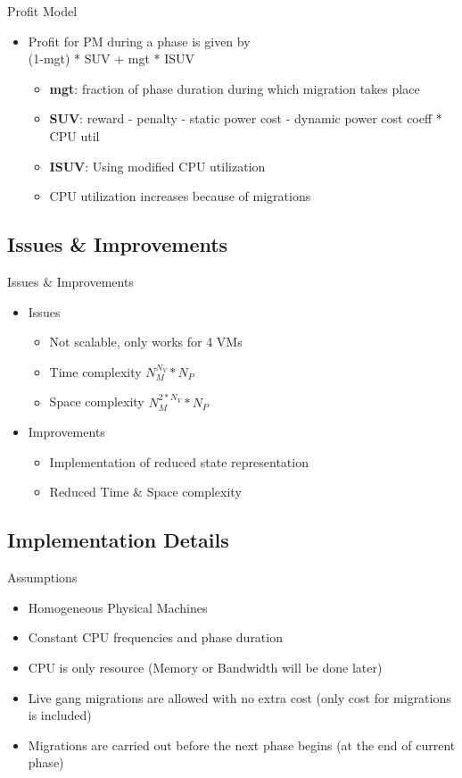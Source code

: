 \documentclass{beamer}
\begin{document}
\begin{frame}{Profit Model}
\begin{itemize}
\item Profit for PM during a phase is given by \\
(1-mgt) * SUV + mgt * ISUV
\begin{itemize}
\item \textbf{mgt}: fraction of phase duration during which migration takes place
\item \textbf{SUV}: reward - penalty - static power cost - dynamic power cost coeff * CPU util
\item \textbf{ISUV}: Using modified CPU utilization
\item CPU utilization increases because of migrations
\end{itemize}
\end{itemize}
\end{frame}

\subsection{Issues \& Improvements}
\begin{frame}{Issues \& Improvements}
\begin{itemize}
\item Issues
\begin{itemize}
\item Not scalable, only works for 4 VMs
\item Time complexity $N_M ^ {N_V} * N_P$
\item Space complexity $N_M ^ {2*N_V} * N _P$
\end{itemize}
\item Improvements
\begin{itemize}
\item Implementation of reduced state representation
\item Reduced Time \& Space complexity
\end{itemize}
\end{itemize}
\end{frame}

\subsection{Implementation Details}
\begin{frame}{Assumptions}
\begin{itemize}
\item Homogeneous Physical Machines
\item Constant CPU frequencies and phase duration
\item CPU is only resource (Memory or Bandwidth will be done later)
\item Live gang migrations are allowed with no extra cost (only cost for migrations is included)
\item Migrations are carried out before the next phase begins (at the end of current phase)
\end{itemize}
\end{frame}
\end{document}
